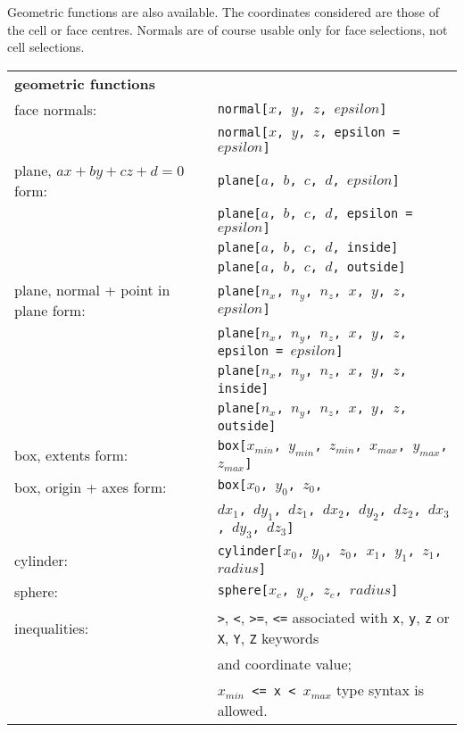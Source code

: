 {{{Geometric functions are also available. The coordinates considered are
those of the cell or face centres. Normals are of course
usable only for face selections, not cell selections.

\begin{tabular}[top]{p{6cm} l}
\multicolumn{2}{l}{\bf geometric functions }\\
face normals:   &  \texttt{normal[$x$, $y$, $z$, $epsilon$]} \\
                &  \texttt{normal[$x$, $y$, $z$, epsilon = $epsilon$]} \\
plane, $ax + by + cz + d = 0$ form: &  \texttt{plane[$a$, $b$, $c$, $d$, $epsilon$]} \\
                &  \texttt{plane[$a$, $b$, $c$, $d$, epsilon = $epsilon$]} \\
                &  \texttt{plane[$a$, $b$, $c$, $d$, inside]} \\
                &  \texttt{plane[$a$, $b$, $c$, $d$, outside]} \\
plane, normal + point in plane form: &  \texttt{plane[$n_x$, $n_y$, $n_z$, $x$, $y$, $z$, $epsilon$]} \\
                &  \texttt{plane[$n_x$, $n_y$, $n_z$, $x$, $y$, $z$, epsilon = $epsilon$]} \\
                &  \texttt{plane[$n_x$, $n_y$, $n_z$, $x$, $y$, $z$, inside]} \\
                &  \texttt{plane[$n_x$, $n_y$, $n_z$, $x$, $y$, $z$, outside]} \\
box, extents form: &  \texttt{box[$x_{min}$, $y_{min}$, $z_{min}$,
                                  $x_{max}$, $y_{max}$, $z_{max}$]} \\
box, origin + axes form: &  \texttt{box[$x_0$, $y_0$, $z_0$,}\\
                         &  \texttt{\qquad $dx_1$, $dy_1$, $dz_1$,
                                        $dx_2$, $dy_2$, $dz_2$,
                                        $dx_3$, $dy_3$, $dz_3$]} \\
cylinder:       &  \texttt{cylinder[$x_0$, $y_0$, $z_0$, $x_1$, $y_1$, $z_1$, $radius$]} \\
sphere:         &  \texttt{sphere[$x_c$, $y_c$, $z_c$, $radius$]} \\
inequalities:   &  \texttt{>}, \texttt{<}, \texttt{>=}, \texttt{<=} associated
                   with \texttt{x}, \texttt{y}, \texttt{z}  or
                   \texttt{X}, \texttt{Y}, \texttt{Z} keywords\\
                &   and coordinate value; \\
                &  \texttt{$x_{min}$ <= x < $x_{max}$} type syntax is allowed. \\
\end{tabular}

}}}
